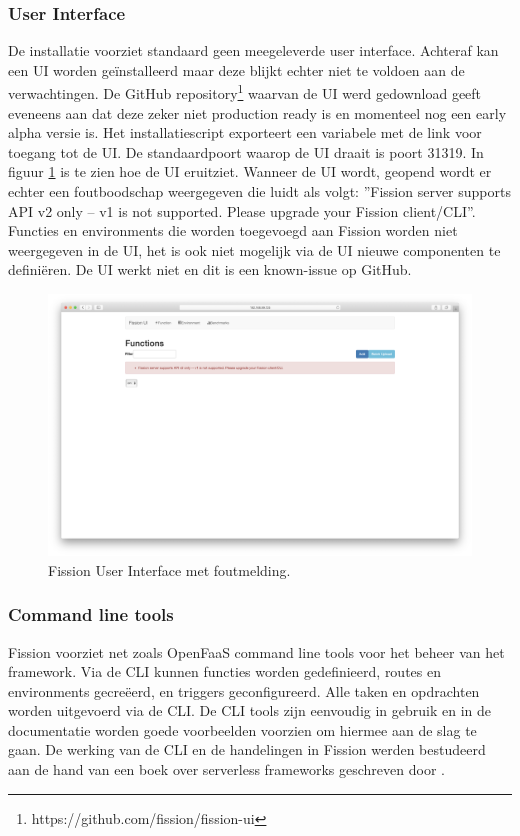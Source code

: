 \subsubsection{User Interface}
De installatie voorziet standaard geen meegeleverde user interface. Achteraf kan een UI worden geïnstalleerd maar deze blijkt echter niet te voldoen aan de verwachtingen. De GitHub repository\footnote{https://github.com/fission/fission-ui} waarvan de UI werd gedownload geeft eveneens aan dat deze zeker niet production ready is en momenteel nog een early alpha versie is. Het installatiescript exporteert een variabele met de link voor toegang tot de UI. De standaardpoort waarop de UI draait is poort 31319. In figuur \ref{fig:fission-ui} is te zien hoe de UI eruitziet. Wanneer de UI wordt, geopend wordt er echter een foutboodschap weergegeven die luidt als volgt: ''Fission server supports API v2 only -- v1 is not supported. Please upgrade your Fission client/CLI''. Functies en environments die worden toegevoegd aan Fission worden niet weergegeven in de UI, het is ook niet mogelijk via de UI nieuwe componenten te definiëren. De UI werkt niet en dit is een known-issue op GitHub.
\begin{figure}
    \includegraphics[width=1\textwidth]{img/fission-ui.png}
    \caption{Fission User Interface met foutmelding.}
    \label{fig:fission-ui}  
\end{figure}

\subsubsection{Command line tools}
Fission voorziet net zoals OpenFaaS command line tools voor het beheer van het framework. Via de CLI kunnen functies worden gedefinieerd, routes en environments gecreëerd, en triggers geconfigureerd. Alle taken en opdrachten worden uitgevoerd via de CLI. De CLI tools zijn eenvoudig in gebruik en in de documentatie worden goede voorbeelden voorzien om hiermee aan de slag te gaan. De werking van de CLI en de handelingen in Fission werden bestudeerd aan de hand van een boek over serverless frameworks geschreven door \textcite{McKendrick2018}.

